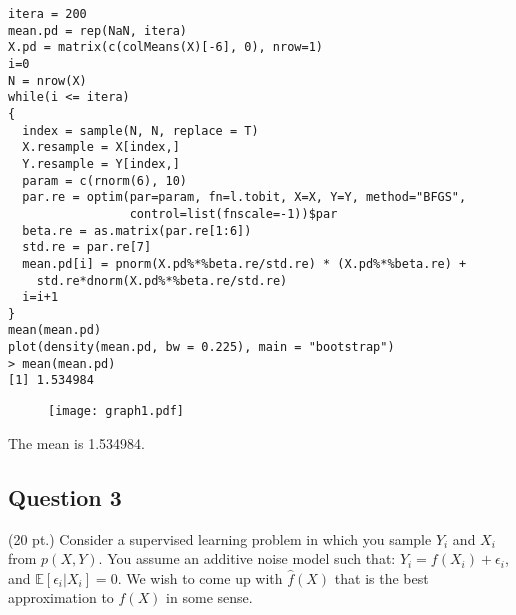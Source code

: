 \documentclass[11pt,english]{article}
\newcommand{\E}{\mathbb{E}}
\begin{document}
\begin{itemize}
\begin{verbatim}
itera = 200
mean.pd = rep(NaN, itera)
X.pd = matrix(c(colMeans(X)[-6], 0), nrow=1)
i=0
N = nrow(X)
while(i <= itera)
{
  index = sample(N, N, replace = T)
  X.resample = X[index,]
  Y.resample = Y[index,]
  param = c(rnorm(6), 10)
  par.re = optim(par=param, fn=l.tobit, X=X, Y=Y, method="BFGS",
                 control=list(fnscale=-1))$par
  beta.re = as.matrix(par.re[1:6])
  std.re = par.re[7]
  mean.pd[i] = pnorm(X.pd%*%beta.re/std.re) * (X.pd%*%beta.re) +
    std.re*dnorm(X.pd%*%beta.re/std.re)
  i=i+1
}
mean(mean.pd)
plot(density(mean.pd, bw = 0.225), main = "bootstrap")
> mean(mean.pd)
[1] 1.534984
\end{verbatim}

\begin{figure}[H]
\texttt{[image: graph1.pdf]}
\end{figure}
The mean is 1.534984.


\end{itemize}

\subsection*{Question 3}
(20 pt.) Consider a supervised learning problem in which you sample $Y_i$ and $X_i$ from $p(X,Y)$. You assume an additive noise model such that: $Y_i=f(X_i)+\epsilon_i$, and $\E[\epsilon_i|X_i]=0$. We wish to come up with $\hat{f}(X)$ that is the best approximation to $f(X)$ in some sense.
\end{document}
